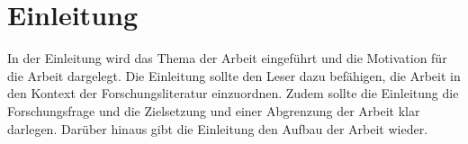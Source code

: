 
\section{Einleitung}
In der Einleitung wird das Thema der Arbeit eingeführt und die Motivation für die Arbeit dargelegt. 
Die Einleitung sollte den Leser dazu befähigen, die Arbeit in den Kontext der Forschungsliteratur einzuordnen.
Zudem sollte die Einleitung die Forschungsfrage und die Zielsetzung und einer Abgrenzung der Arbeit klar darlegen.
Darüber hinaus gibt die Einleitung den Aufbau der Arbeit wieder. 

